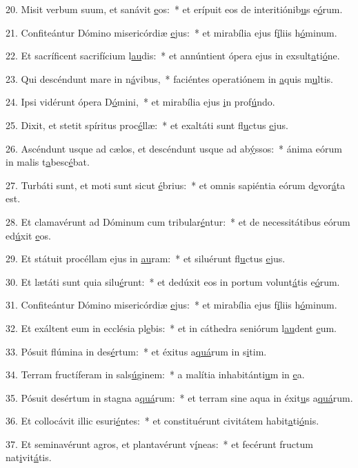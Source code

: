20. Misit verbum suum, et sanávit \uline{e}os:~* et erípuit eos de interitiónib\uline{u}s e\uline{ó}rum.\par 
21. Confiteántur Dómino misericórdiæ \uline{e}jus:~* et mirabília ejus f\uline{í}liis h\uline{ó}minum.\par 
22. Et sacríficent sacrifícium l\uline{au}dis:~* et annúntient ópera ejus in exsult\uline{a}ti\uline{ó}ne.\par 
23. Qui descéndunt mare in n\uline{á}vibus,~* faciéntes operatiónem in \uline{a}quis m\uline{u}ltis.\par 
24. Ipsi vidérunt ópera D\uline{ó}mini,~* et mirabília ejus \uline{i}n prof\uline{ú}ndo.\par 
25. Dixit, et stetit spíritus proc\uline{é}llæ:~* et exaltáti sunt fl\uline{u}ctus \uline{e}jus.\par 
26. Ascéndunt usque ad cælos, et descéndunt usque ad ab\uline{ý}ssos:~* ánima eórum in malis t\uline{a}besc\uline{é}bat.\par 
27. Turbáti sunt, et moti sunt sicut \uline{é}brius:~* et omnis sapiéntia eórum d\uline{e}vor\uline{á}ta est.\par 
28. Et clamavérunt ad Dóminum cum tribular\uline{é}ntur:~* et de necessitátibus eórum ed\uline{ú}xit \uline{e}os.\par 
29. Et státuit procéllam ejus in \uline{au}ram:~* et siluérunt fl\uline{u}ctus \uline{e}jus.\par 
30. Et lætáti sunt quia silu\uline{é}runt:~* et dedúxit eos in portum volunt\uline{á}tis e\uline{ó}rum.\par 
31. Confiteántur Dómino misericórdiæ \uline{e}jus:~* et mirabília ejus f\uline{í}liis h\uline{ó}minum.\par 
32. Et exáltent eum in ecclésia pl\uline{e}bis:~* et in cáthedra seniórum l\uline{au}dent \uline{e}um.\par 
33. Pósuit flúmina in des\uline{é}rtum:~* et éxitus a\uline{quá}rum in s\uline{i}tim.\par 
34. Terram fructíferam in sals\uline{ú}ginem:~* a malítia inhabitánti\uline{u}m in \uline{e}a.\par 
35. Pósuit desértum in stagna a\uline{quá}rum:~* et terram sine aqua in éxit\uline{u}s a\uline{quá}rum.\par 
36. Et collocávit illic esuri\uline{é}ntes:~* et constituérunt civitátem habit\uline{a}ti\uline{ó}nis.\par 
37. Et seminavérunt agros, et plantavérunt v\uline{í}neas:~* et fecérunt fructum nat\uline{i}vit\uline{á}tis.\par 
